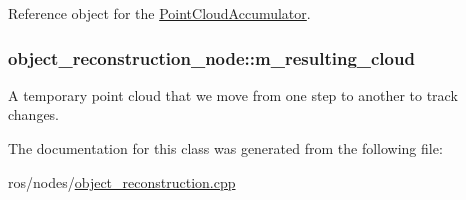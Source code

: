 \-Reference object for the \hyperlink{class_point_cloud_accumulator}{\-Point\-Cloud\-Accumulator}. 

\hypertarget{classobject__reconstruction__node_ab8f97cd647f37bc708c8d7542150c17c}{
\subsubsection[{m\-\_\-resulting\-\_\-cloud}]{ {\bf object\-\_\-reconstruction\-\_\-node\-::m\-\_\-resulting\-\_\-cloud}}}\label{classobject__reconstruction__node_ab8f97cd647f37bc708c8d7542150c17c}


\-A temporary point cloud that we move from one step to another to track changes. 



\-The documentation for this class was generated from the following file\-:\begin{DoxyCompactItemize}
\item 
ros/nodes/\hyperlink{object__reconstruction_8cpp}{object\-\_\-reconstruction.\-cpp}\end{DoxyCompactItemize}
